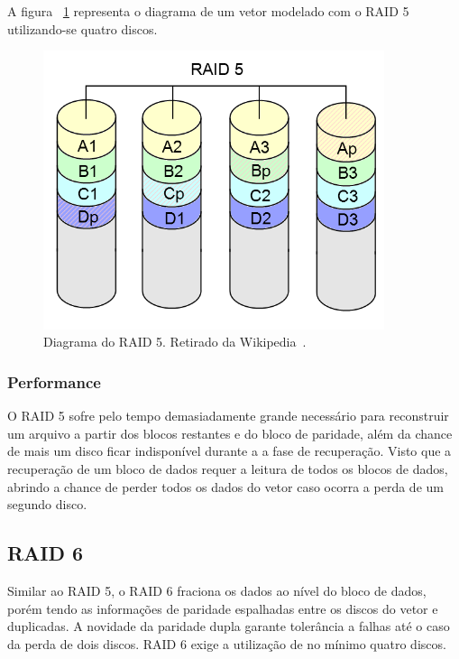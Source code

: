 		A figura ~\ref{fig:raid5} representa o diagrama de um vetor modelado com o RAID 5 utilizando-se quatro discos.\\
		
		\begin{figure}[htb]
			\begin{center}
				
				\includegraphics[clip,width=10.0cm]{images/RAID_5.png}
				\caption{Diagrama do RAID 5. Retirado da Wikipedia~\citep{wikiRAIDlevels}.}
				\label{fig:raid5}
			\end{center}
		\end{figure} 
		
		\subsubsection{Performance}
		O RAID 5 sofre pelo tempo demasiadamente grande necessário para reconstruir um arquivo a partir dos blocos restantes e do bloco de paridade, além da chance de mais um disco ficar indisponível durante a a fase de recuperação. Visto que a recuperação de um bloco de dados requer a leitura de todos os blocos de dados, abrindo a chance de perder todos os dados do vetor caso ocorra a perda de um segundo disco.\\
		
		\subsection{RAID 6}
		Similar ao RAID 5, o RAID 6 fraciona os dados ao nível do bloco de dados, porém tendo as informações de paridade espalhadas entre os discos do vetor e duplicadas. A novidade da paridade dupla garante tolerância a falhas até o caso da perda de dois discos. RAID 6 exige a utilização de no mínimo quatro discos. \\ 
		
